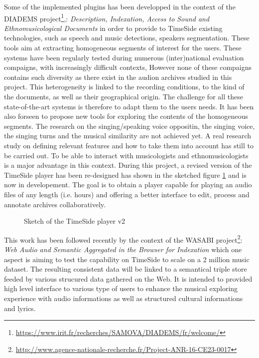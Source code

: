 \documentclass{article}
\begin{document}
Some of the implemented plugins has been developped in the context of the DIADEMS project\footnote{\tiny\url{https://www.irit.fr/recherches/SAMOVA/DIADEMS/fr/welcome/}},: \textit{Description, Indexation, Access to Sound and Ethnomusicological Documents} in order to provide to TimeSide existing technologies, such as speech and music detections, speakers segmentation. These tools aim at extracting homogeneous segments of interest for the users. These systems have been regularly tested during numerous (inter)national evaluation compaigns, with increasingly difficult contexts, However none of these compaigns contains such diversity as there exist in the audion archives studied in this project. This heterogeneity is linked to the recording conditions, to the kind of the documents, as well as their geographical origin. The challenge for all these state-of-the-art systems is therefore to adapt them to the users needs. It has been also forseen to propose new tools for exploring the contents of the homogeneous segments. The research on the singing/speaking voice oppositin, the singing voice, the singing turns and the musical similarity are not achieved yet. A real research study on defining relevant features and how to take them into account has still to be carried out. To be able to interact with musicologists and ethnomusicologists is a major advantage in this context. During this project, a revised version of the TimeSide player has been re-designed has shown in the sketched figure \ref{fig:ts_player_v2} and is now in developement. The goal is to obtain a player capable for playing an audio files of any length (i.e. hours) and offering a better interface to edit, process and annotate archives collaboratively.

\begin{figure}
 \centerline{}
 \caption{Sketch of the TimeSide player v2}
 \label{fig:ts_player_v2}
\end{figure}

This work has been followed recently by the context of the WASABI project\footnote{\tiny\url{http://www.agence-nationale-recherche.fr/Project-ANR-16-CE23-0017}}: \textit{Web Audio and Semantic Aggregated in the Browser for Indexation} which one aspect is aiming to test the capability on TimeSide to scale on a 2 million music dataset. The resulting consistent data will be linked to a semantical triple store feeded by various strucured data gathered on the Web. It is intended to provided high level interface to various type of users to enhance the musical exploring experience with audio informations as well as structured cultural informations and lyrics.
\end{document}
